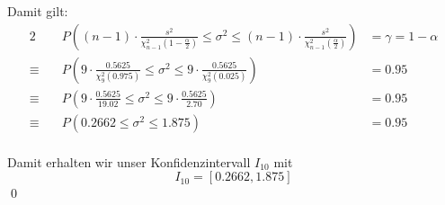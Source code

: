 \documentclass{abgabe}
\begin{document}
\begin{questions}
\begin{solution}
        Damit gilt:
        \begin{alignat*}{2}
                         & P((n-1) \cdot \frac{s^2}{\chi^2_{n-1} \left( 1 - \frac{\alpha}{2} \right)} \leq  \sigma^2 \leq (n-1) \cdot \frac{s^2}{\chi^2_{n-1} \left(\frac{\alpha}{2} \right)}) & = \gamma = 1 - \alpha \\
            \equiv \quad & P(9 \cdot \frac{0.5625}{\chi^2_{9} \left( 0.975 \right)}                   \leq \sigma^2  \leq 9 \cdot \frac{0.5625}{\chi^2_9 \left(0.025 \right)})                 & = 0.95                \\
            \equiv \quad & P(9 \cdot \frac{0.5625}{19.02}                                             \leq \sigma^2  \leq 9 \cdot \frac{0.5625}{2.70})                                         & = 0.95                \\
            \equiv \quad & P(0.2662                                                                   \leq \sigma^2  \leq 1.875)                                                               & = 0.95                \\
        \end{alignat*}

        Damit erhalten wir unser Konfidenzintervall $I_{10}$ mit
        \[
            I_{10} = [0.2662, 1.875]
        \]
        \qed
    \end{solution}
\end{questions}
\end{document}
